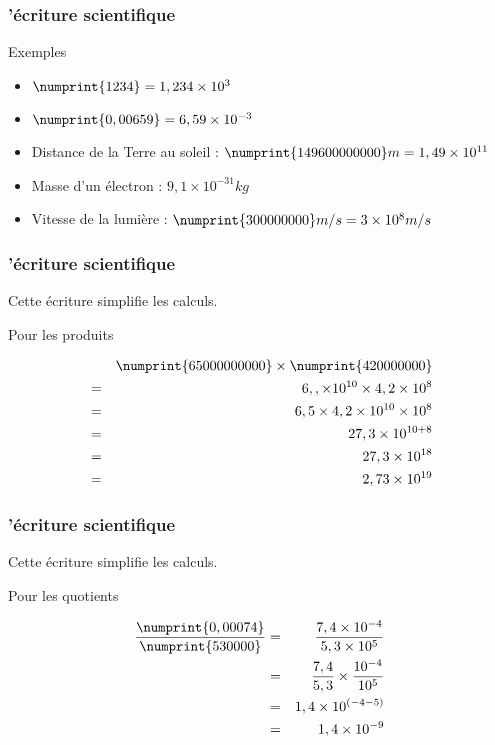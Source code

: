 \documentclass{beamer}
\begin{document}
\begin{frame}
  \frametitle{'écriture scientifique}


 \begin{block}{Exemples}
	  \begin{itemize}
  \item $\numprint{1 234} = 1,234 \times 10^3$
  \item $\numprint{0,00659} = 6,59 \times 10^{-3}$
  \item Distance de la Terre au soleil :  $\numprint{149 600 000 000}m = 1,49 \times 10^{11}$
  \item Masse d'un électron : $9,1 \times 10^{-31}kg$
  \item Vitesse de la lumière : $\numprint{300 000 000}m/s = 3 \times 10 ^8 m/s$
  \end{itemize}

  \end{block}

\end{frame}

\begin{frame}
  \frametitle{'écriture scientifique}

Cette écriture simplifie les calculs.

 \begin{block}{Pour les produits}

  \begin{eqnarray*}
    & & \numprint{65 000 000 000} \times \numprint{420 000 000} \\
    &=& 6,, \times 10 ^{10} \times 4,2 \times 10 ^{8} \\
    &=& 6,5 \times 4,2 \times 10^{10} \times 10^8 \\
    &=& 27,3 \times 10^{10 + 8}\\
    &=& 27,3 \times 10^{18} \\
    &=& 2,73 \times 10^{19}
  \end{eqnarray*}


  \end{block}

\end{frame}


\begin{frame}
  \frametitle{'écriture scientifique}

Cette écriture simplifie les calculs.

 \begin{block}{Pour les quotients}

  \begin{eqnarray*}
    \dfrac{\numprint{0, 000 74}}{\numprint{530 000}} &=& \dfrac{7,4 \times 10^{-4}}{5,3 \times 10^{5}} \\
    &=& \dfrac{7,4}{5,3} \times \dfrac{10^{-4}}{10^{5}} \\
    &=& 1,4 \times 10^{( -4 - 5 )} \\
    &=& 1,4 \times 10^{-9}
  \end{eqnarray*}

  \end{block}

\end{frame}
\end{document}
